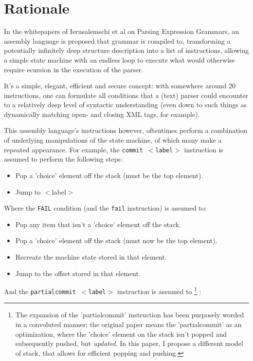 \section{Rationale}

In the whitepapers of Ierusalemschi et al \cite{bib:peg}
on Parsing Expression Grammars,
an assembly language is proposed that grammar is
compiled to, transforming a potentially infinitely deep structure
description into a list of instructions, allowing a simple state machine
with an endless loop to execute what would otherwise require 
ecursion in the execution of the parser.

It's a simple, elegant, efficient and secure concept:
with somewhere around 20 instructions, one can
formulate all conditions that a (text) parser could encounter
to a relatively deep level of syntactic understanding (even down
to such things as dynamically matching open- and closing XML tags,
for example).

This assembly language's instructions however,
oftentimes perform a combination of underlying manipulations of the
state machine, of which many make a repeated appearance.
For example, the \texttt{commit $<$label$>$} instruction is assumed to
perform the following steps:

\begin{itemize}
\item Pop a 'choice' element off the stack (must be the top element).
\item Jump to $<$label$>$
\end{itemize}

Where the \texttt{FAIL} condition (and the \texttt{fail} instruction)
is assumed to:

\begin{itemize}
\item Pop any item that isn't a 'choice' element off the stack.
\item Pop a 'choice' element off the stack (must now be the top element).
\item Recreate the machine state stored in that element.
\item Jump to the offset stored in that element.
\end{itemize}

And the \texttt{partialcommit $<$label$>$} instruction is assumed to
 \footnote{The expansion of the 'partialcommit' instruction has been purposely
worded in a convoluted manner; the original paper means the 'partialcommit'
as an optimization, where the 'choice' element on the stack isn't popped
and subsequently pushed, but \textit{updated}. In this paper, I propose
a different model of stack, that allows for efficient popping and pushing.}
:

